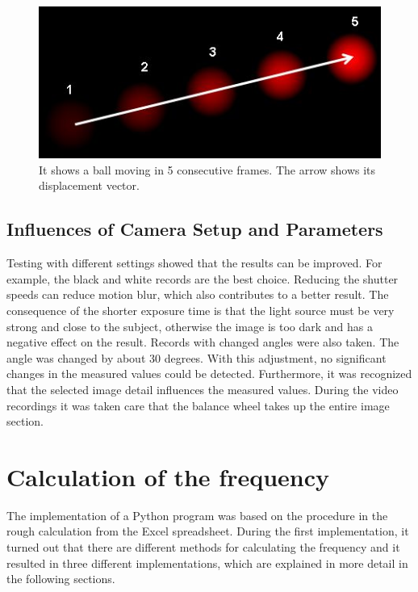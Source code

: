 \documentclass[12pt, a4paper]{report}
\begin{document}
    \noindent
    \begin{figure}[H]
    \centering
    \includegraphics[scale=0.7]{Images/optical_flow_basic1.jpg}
    
    \caption{It shows a ball moving in 5 consecutive frames. The arrow shows its displacement vector.}
    \end{figure}
    
    \section{Influences of Camera Setup and Parameters}
    Testing with different settings showed that the results can be improved. For example, the black and white records are the best choice. Reducing the shutter speeds can reduce motion blur, which also contributes to a better result.
    The consequence of the shorter exposure time is that the light source must be very strong and close to the subject, otherwise the image is too dark and has a negative effect on the result.
    Records with changed angles were also taken. The angle was changed by about 30 degrees. With this adjustment, no significant changes in the measured values could be detected.
    Furthermore, it was recognized that the selected image detail influences the measured values. During the video recordings it was taken care that the balance wheel takes up the entire image section.
    \newpage
    
    \chapter{Calculation of the frequency}
    The implementation of a Python program was based on the procedure in the rough calculation from the Excel spreadsheet. During the first implementation, it turned out that there are different methods for calculating the frequency and it resulted in three different implementations, which are explained in more detail in the following sections.
    
\end{document}
